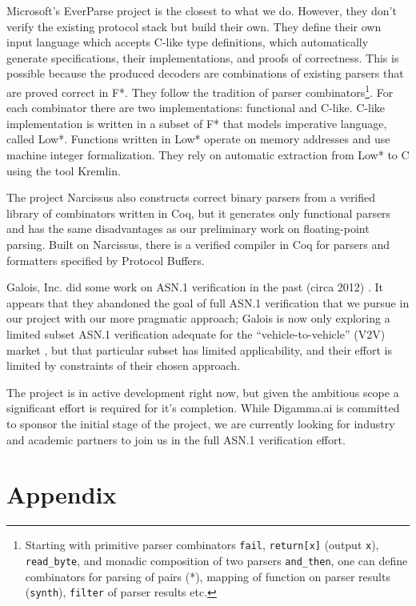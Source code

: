 \documentclass[10p,conference]{IEEEtran}
\begin{document}
Microsoft's EverParse project \cite{RamananandroDFS19} is the closest
to what we do. However, they don't verify the existing protocol stack but
build their own. They define their own input language which accepts
C-like type definitions, which automatically generate specifications, their implementations, and proofs of correctness. This is possible because the produced decoders are combinations of existing parsers that are proved correct in F*. They
follow the tradition of parser combinators\footnote{Starting with
  primitive parser combinators \texttt{fail}, \texttt{return[x]}
  (output \texttt{x}), \texttt{read\_byte}, and monadic composition of
  two parsers \texttt{and\_then}, one can define combinators for
  parsing of pairs (*), mapping of function on parser results
  (\texttt{synth}), \texttt{filter} of parser results etc.}. For each
combinator there are two implementations: functional and
C-like. C-like implementation is written in a subset of F* that models
imperative language, called Low*. Functions written in Low* operate on
memory addresses and use machine integer formalization. They rely on
automatic extraction from Low* to C using the tool Kremlin.

The project Narcissus \cite{Narcissus} also constructs correct binary parsers from a verified
library of combinators written in Coq, but it generates only functional
parsers and has the same disadvantages as our preliminary work on floating-point parsing. Built on Narcissus, there is a verified compiler in Coq for
parsers and formatters specified by Protocol Buffers.
 
Galois, Inc. did some work on ASN.1 verification in the past (circa
2012) \cite{ASN1FormalSem}. It appears that they abandoned the goal of
full ASN.1 verification \cite{ASN1EncDec} that we pursue in our
project with our more pragmatic approach; Galois is now only exploring
a limited subset ASN.1 verification adequate for the
``vehicle-to-vehicle'' (V2V) market \cite{V2V}, but that particular
subset has limited applicability, and their effort is limited by
constraints of their chosen approach.

The project is in active development right now, but given the
ambitious scope a significant effort is required for it's completion.
While Digamma.ai is committed to sponsor the initial stage of the
project, we are currently looking for industry and academic partners
to join us in the full ASN.1 verification effort.

 \onecolumn
\section*{Appendix}
\end{document}
